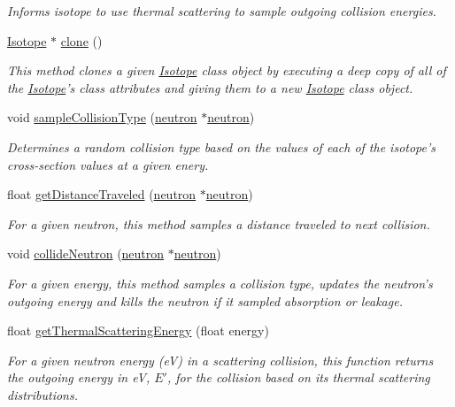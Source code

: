 \begin{DoxyCompactItemize}
\begin{DoxyCompactList}\small\item\em Informs isotope to use thermal scattering to sample outgoing collision energies. \end{DoxyCompactList}\item 
\hyperlink{classIsotope}{Isotope} $\ast$ \hyperlink{classIsotope_aa1bec1b87123c3659a64d7cd35deca47}{clone} ()
\begin{DoxyCompactList}\small\item\em This method clones a given \hyperlink{classIsotope}{Isotope} class object by executing a deep copy of all of the \hyperlink{classIsotope}{Isotope}'s class attributes and giving them to a new \hyperlink{classIsotope}{Isotope} class object. \end{DoxyCompactList}\item 
void \hyperlink{classIsotope_a6de585520f73b54ebe6808b44d2465f2}{sample\-Collision\-Type} (\hyperlink{structneutron}{neutron} $\ast$\hyperlink{structneutron}{neutron})
\begin{DoxyCompactList}\small\item\em Determines a random collision type based on the values of each of the isotope's cross-\/section values at a given enery. \end{DoxyCompactList}\item 
float \hyperlink{classIsotope_af6d01d6031524a065bc7085c7e678274}{get\-Distance\-Traveled} (\hyperlink{structneutron}{neutron} $\ast$\hyperlink{structneutron}{neutron})
\begin{DoxyCompactList}\small\item\em For a given neutron, this method samples a distance traveled to next collision. \end{DoxyCompactList}\item 
void \hyperlink{classIsotope_afc161538a2b6d971cb355f616880125b}{collide\-Neutron} (\hyperlink{structneutron}{neutron} $\ast$\hyperlink{structneutron}{neutron})
\begin{DoxyCompactList}\small\item\em For a given energy, this method samples a collision type, updates the neutron's outgoing energy and kills the neutron if it sampled absorption or leakage. \end{DoxyCompactList}\item 
float \hyperlink{classIsotope_ad2860a87d7b2df1e693701b31c71441a}{get\-Thermal\-Scattering\-Energy} (float energy)
\begin{DoxyCompactList}\small\item\em For a given neutron energy (e\-V) in a scattering collision, this function returns the outgoing energy in e\-V, $ E' $, for the collision based on its thermal scattering distributions. \end{DoxyCompactList}\item 

\end{DoxyCompactItemize}
